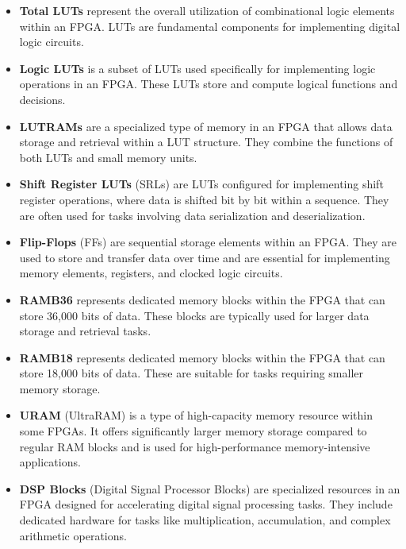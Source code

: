 \begin{itemize}
    
\item \textbf{Total LUTs} represent the overall utilization of combinational logic elements within an FPGA. LUTs are fundamental components for implementing digital logic circuits.

\item \textbf{Logic LUTs} is a subset of LUTs used specifically for implementing logic operations in an FPGA. These LUTs store and compute logical functions and decisions.

\item \textbf{LUTRAMs} are a specialized type of memory in an FPGA that allows data storage and retrieval within a LUT structure. They combine the functions of both LUTs and small memory units.

\item \textbf{Shift Register LUTs} (SRLs) are LUTs configured for implementing shift register operations, where data is shifted bit by bit within a sequence. They are often used for tasks involving data serialization and deserialization.

\item \textbf{Flip-Flops} (FFs) are sequential storage elements within an FPGA. They are used to store and transfer data over time and are essential for implementing memory elements, registers, and clocked logic circuits.

\item \textbf{RAMB36} represents dedicated memory blocks within the FPGA that can store 36,000 bits of data. These blocks are typically used for larger data storage and retrieval tasks.

\item \textbf{RAMB18} represents dedicated memory blocks within the FPGA that can store 18,000 bits of data. These are suitable for tasks requiring smaller memory storage.

\item \textbf{URAM} (UltraRAM) is a type of high-capacity memory resource within some FPGAs. It offers significantly larger memory storage compared to regular RAM blocks and is used for high-performance memory-intensive applications.

\item \textbf{DSP Blocks} (Digital Signal Processor Blocks) are specialized resources in an FPGA designed for accelerating digital signal processing tasks. They include dedicated hardware for tasks like multiplication, accumulation, and complex arithmetic operations.

\end{itemize}

